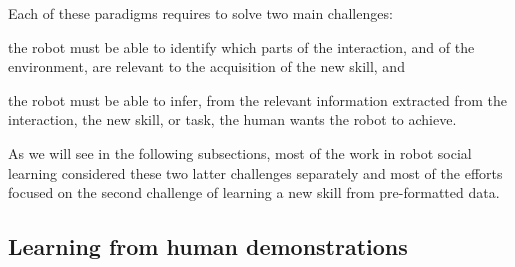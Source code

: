 Each of these paradigms requires to solve two main challenges: \begin{inparaenum}[(1)] \item the robot must be able to identify which parts of the interaction, and of the environment, are relevant to the acquisition of the new skill, and \item the robot must be able to infer, from the relevant information extracted from the interaction, the new skill, or task, the human wants the robot to achieve. \end{inparaenum}

As we will see in the following subsections, most of the work in robot social learning considered these two latter challenges separately and most of the efforts focused on the second challenge of learning a new skill from pre-formatted data.



\subsection{Learning from human demonstrations}

